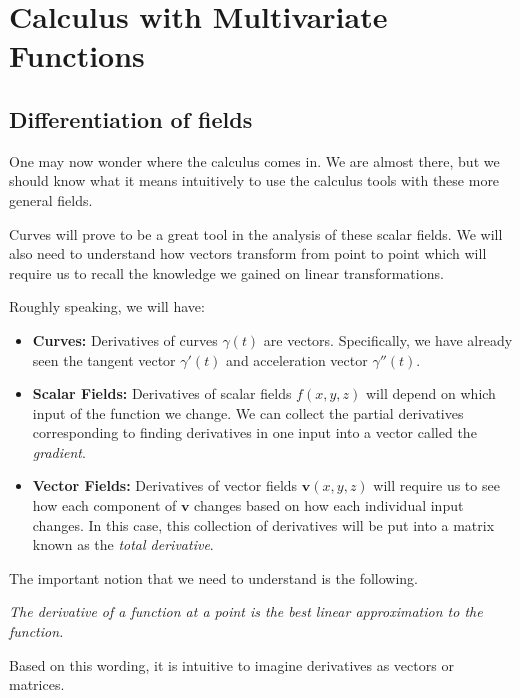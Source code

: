     \chapter{Calculus with Multivariate Functions}
        
        \section{Differentiation of fields}
        One may now wonder where the calculus comes in.  We are almost there, but we should know what it means intuitively to use the calculus tools with these more general fields.
        
        Curves will prove to be a great tool in the analysis of these scalar fields.  We will also need to understand how vectors transform from point to point which will require us to recall the knowledge we gained on linear transformations.
        
        Roughly speaking, we will have:
        \begin{itemize}
            \item \textbf{Curves:} Derivatives of curves $\gamma(t)$ are vectors. Specifically, we have already seen the tangent vector $\gamma'(t)$ and acceleration vector $\gamma''(t)$.
            \item \textbf{Scalar Fields:} Derivatives of scalar fields $f(x,y,z)$ will depend on which input of the function we change.  We can collect the partial derivatives corresponding to finding derivatives in one input into a vector called the \emph{gradient}.
            \item \textbf{Vector Fields:} Derivatives of vector fields $\mathbf{v}(x,y,z)$ will require us to see how each component of $\mathbf{v}$ changes based on how each individual input changes.  In this case, this collection of derivatives will be put into a matrix known as the \emph{total derivative}.
        \end{itemize}
        
        \begin{remark}
        The important notion that we need to understand is the following.
        
        \emph{The derivative of a function at a point is the best linear approximation to the function.} 
        
        Based on this wording, it is intuitive to imagine derivatives as vectors or matrices.
        \end{remark}
        
